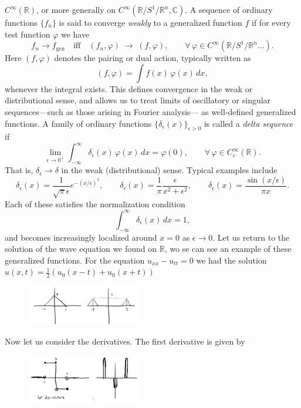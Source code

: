 \documentclass[11pt,a4paper]{article}
\begin{document}
$C^{\infty}(\mathbb{R})$, or more generally on $C^{\infty}(\mathbb{R}/S^{1}/\mathbb{R}^{n},\mathbb{C})$. 
A sequence of ordinary functions $\{f_{n}\}$ is said to converge \emph{weakly} to a generalized function $f$ 
if for every test function $\varphi$ we have
\[
f_{n} \to f_{\text{gen}} 
\quad \text{iff} \quad 
(f_{n},\varphi) \;\longrightarrow\; (f,\varphi),
\qquad 
\forall\,\varphi \in C^{\infty}(\mathbb{R}/S^{1}/\mathbb{R}^{n}...).
\]
Here $(f,\varphi)$ denotes the pairing or dual action, typically written as
\[
(f,\varphi) = \int f(x)\,\varphi(x)\,dx,
\]
whenever the integral exists.  
This defines convergence in the weak or distributional sense, 
and allows us to treat limits of oscillatory or singular sequences—such as those arising in Fourier analysis—
as well-defined generalized functions.
A family of ordinary functions $\{\delta_{\epsilon}(x)\}_{\epsilon>0}$ is called a 
\textit{delta sequence} if
\[
\lim_{\epsilon\to 0^{+}} \int_{-\infty}^{\infty} \delta_{\epsilon}(x)\,\varphi(x)\,dx 
= \varphi(0),
\qquad \forall\,\varphi\in C^{\infty}_{c}(\mathbb{R}).
\]
That is, $\delta_{\epsilon}\to\delta$ in the weak (distributional) sense.  
Typical examples include
\[
\delta_{\epsilon}(x)
= \frac{1}{\sqrt{\pi}\epsilon}e^{-(x/\epsilon)^{2}}, 
\qquad
\delta_{\epsilon}(x)
= \frac{1}{\pi}\frac{\epsilon}{x^{2}+\epsilon^{2}}, 
\qquad
\delta_{\epsilon}(x)
= \frac{\sin(x/\epsilon)}{\pi x}.
\]
Each of these satisfies the normalization condition
\[
\int_{-\infty}^{\infty}\delta_{\epsilon}(x)\,dx = 1,
\]
and becomes increasingly localized around $x=0$ as $\epsilon\to 0$. Let us return to the solution of the wave equation we found on $\mathbb{R}$, wo se can see an example of these generalized functions. For the equation $u_{xx}-u_{tt} = 0$ we had the solution  $u(x,t) = \frac{1}{2}(u_{0}(x-t)+u_{0}(x+t))$
\begin{figure}[H]
	\centering
	\includegraphics[width=0.45\textwidth]{wave1.png} %
\end{figure}
Now let us consider the derivatives. The first derivative is given by
\begin{figure}[H]
	\centering
	\includegraphics[width=0.45\textwidth]{derivatives.png} %
\end{figure}
\end{document}

